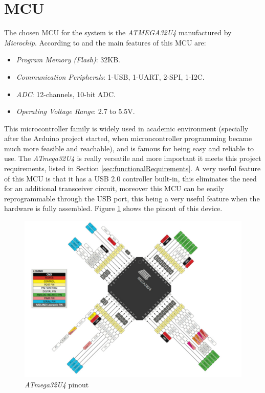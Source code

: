 \section{MCU}\label{sec:mcu-hw}

	The chosen MCU for the system is the \textit{ATMEGA32U4} manufactured by \textit{Microchip}. According to \cite{atmega32u4-features} and \cite{atmega32u4-datasheet} the main features of this MCU are:
		\begin{itemize}
			\item{\textit{Program Memory (Flash)}}: 32KB.\label{itm:program-memory-flash}
			\item{\textit{Communication Peripherals}}: 1-USB, 1-UART, 2-SPI, 1-I2C.\label{itm:communication-peripherals}
			\item{\textit{ADC}}: 12-channels, 10-bit ADC.\label{itm:hw-mcu-adc}
			\item{\textit{Operating Voltage Range}}: 2.7 to 5.5V.\label{itm:operating-voltage-range}
		\end{itemize}
	\par
	This microcontroller family is widely used in academic environment (specially after the Arduino project started, when microncontroller programming became much more feasible and reachable), and is famous for being easy and reliable to use. The \textit{ATmega32U4} is really versatile and more important it meets this project requirements, listed in Section \ref{sec:functionalRequirements}. A very useful feature of this MCU is that it has a USB 2.0 controller built-in, this eliminates the need for an additional transceiver circuit, moreover this MCU can be easily reprogrammable through the USB port, this being a very useful feature when the hardware is fully assembled. Figure \ref{fig:atmega32u4-pinout} shows the pinout of this device.

	\begin{figure}[htbp]
		\centering
		\includegraphics[width=1\textwidth]{figuras/fig-atmega32u4-pinout.png}
		\caption{\textit{ATmega32U4} pinout \cite{atmega32u4-pinout}}
		\label{fig:atmega32u4-pinout}
	\end{figure}
		

